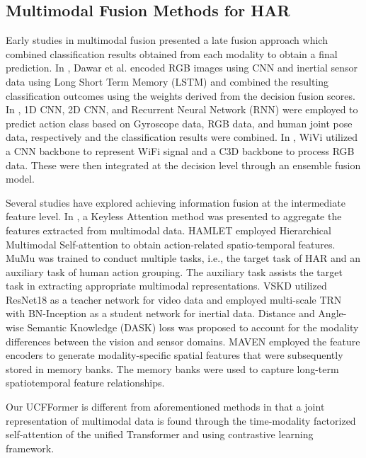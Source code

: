 \subsection{Multimodal Fusion Methods for HAR}
Early studies in multimodal fusion presented a late fusion approach which combined classification results obtained from each modality to obtain a final prediction. 
In \cite{dawar2018action,dawar2018data}, Dawar et al. encoded RGB images using CNN and inertial sensor data using Long Short Term Memory (LSTM) and combined the resulting classification outcomes using the weights derived from the decision fusion scores. In \cite{imran2020evaluating}, 1D CNN, 2D CNN, and Recurrent Neural Network (RNN) were employed to predict action class based on Gyroscope data, RGB data, and human joint pose data, respectively and the classification results were combined. 
In \cite{zou2019wifi}, WiVi utilized a CNN backbone to represent WiFi signal and a C3D backbone \cite{tran2015learning} to process RGB data. These were then integrated at the decision level through an ensemble fusion model.

Several studies have explored achieving information fusion at the intermediate feature level.  
In \cite{long2018multimodal}, a Keyless Attention method was presented to aggregate the features extracted from multimodal data.
HAMLET \cite{islam2020hamlet} employed Hierarchical Multimodal Self-attention to obtain action-related spatio-temporal features. MuMu \cite{islam2022mumu} was trained to conduct multiple tasks, i.e.,  the target task of HAR and an auxiliary task of human action grouping. The auxiliary task assists the target task in extracting appropriate multimodal representations.
VSKD \cite{ni2022cross} utilized ResNet18 as a teacher network for video data and employed multi-scale TRN \cite{zhou2018temporal} with BN-Inception as a student network for inertial data.  Distance and Angle-wise Semantic Knowledge (DASK) loss was proposed to account for the modality differences between the vision and sensor domains.
MAVEN \cite{islam2022maven}  employed the feature encoders to generate modality-specific spatial features that were subsequently stored in memory banks. The memory banks were used to capture long-term spatiotemporal feature relationships. 

Our UCFFormer is different from aforementioned methods in that a joint representation of multimodal data is found through the time-modality factorized self-attention of the unified Transformer and using contrastive learning framework.

